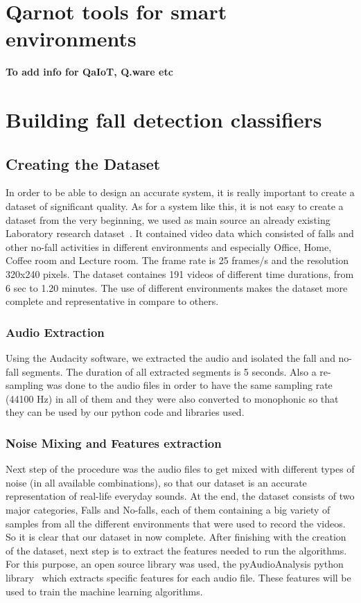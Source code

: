 \documentclass[10pt, conference, compsocconf]{IEEEtran}
\begin{document}
\section{Qarnot tools for smart environments} \label{Smart}

{\bf To add info for QaIoT, Q.ware etc} 


\section{Building fall detection classifiers} \label{Fall}

\subsection{Creating the Dataset} 
 
In order to be able to design an accurate system, it is really important to create a dataset of significant quality. As for a system like this, it is not easy to create a dataset from the very beginning, we used as main source an already existing Laboratory research dataset~\cite{Dataset}. It contained video data which consisted of falls and other no-fall activities in different environments and especially Office, Home, Coffee room and Lecture room. The frame rate is 25 frames/s and the resolution 320x240 pixels. The dataset containes 191 videos of different time durations, from 6 sec to 1.20 minutes. The use of different environments makes the dataset more complete and representative in compare to others.  

\subsubsection{Audio Extraction}

Using the Audacity software, we extracted the audio and isolated the fall and no-fall segments. The duration of all extracted segments is 5 seconds. Also a re-sampling was done to the audio files in order to have the same sampling rate (44100 Hz) in all of them and they were also converted to monophonic so that they can be used by our python code and libraries used.

\subsubsection{Noise Mixing and Features extraction}

Next step of the procedure was the audio files to get mixed with different types of noise (in all available combinations), so that our dataset is an accurate representation of real-life everyday sounds. At the end, the dataset consists of two major categories, Falls and No-falls, each of them containing a big variety of samples from all the different environments that were used to record the videos. So it is clear that our dataset in now complete. After finishing with the creation of the dataset, next step is to extract the features needed to run the algorithms. For this purpose, an open source library was used, the pyAudioAnalysis python library~\cite{giannakopoulos2015pyaudioanalysis} which extracts specific features for each audio file. These features will be used to train the machine learning algorithms.
\end{document}
